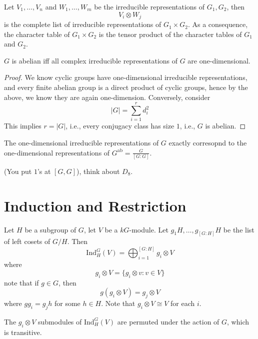 \documentclass[openany]{book}
\begin{document}
\begin{prop}
    Let $V_1,\dots, V_n$ and $W_1,\dots, W_m$ be the irreducible representations of $G_1,G_2$, then 
    \begin{equation*}
        V_i\otimes W_j
    \end{equation*}
    is the complete list of irreducible representations of $G_1\times G_2$. As a consequence, the character table of $G_1\times G_2$ is the tensor product of the character tables of $G_1$ and $G_2$.
\end{prop}


\begin{prop}
    $G$ is abelian iff all complex irreducible representations of $G$ are one-dimensional.
\end{prop}
\begin{proof}
    We know cyclic groups have one-dimensional irreducible representations, and every finite abelian group is a direct product of cyclic groups, hence by the above, we know they are again one-dimension. Conversely, consider 
    \begin{equation*}
        |G|=\sum_{i=1}^rd_i^2
    \end{equation*}
    This implies $r=|G|$, i.e., every conjugacy class has size $1$, i.e., $G$ is abelian.
\end{proof}

\begin{prop}
    The one-dimensional irreducible representations of $G$ exactly corresopnd to the one-dimensional representations of $G^{\text{ab}}=\frac{G}{[G:G]}$. 
    
    (You put $1$'s at $[G,G]$), think about $D_8$.
\end{prop}







\section{Induction and Restriction}

\begin{defn}
    Let $H$ be a subgroup of $G$, let $V$ be a $kG$-module. Let $g_1H, \dots, g_{[G:H]}H$ be the list of left cosets of $G/H$. Then 
    \begin{equation*}
        \text{Ind}_H^G(V)=\bigoplus_{i=1}^{[G:H]}g_i\otimes V
    \end{equation*}
    where 
    \begin{equation*}
        g_i\otimes V=\{g_i\otimes v: v\in V\}
    \end{equation*}
    note that if $g\in G$, then 
    \begin{equation*}
        g(g_i\otimes V)=g_j\otimes V
    \end{equation*}
    where $gg_i=g_jh$ for some $h\in H$. Note that $g_i\otimes V\cong V$ for each $i$. 
\end{defn}
The $g_i\otimes V$ submodules of $\text{Ind}_H^G(V)$ are permuted under the action of $G$, which is transitive.
\end{document}

